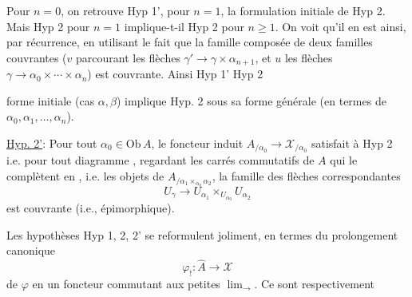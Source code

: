 Pour $n=0$, on retrouve Hyp 1', pour $n=1$, la formulation initiale de Hyp 2. Mais Hyp 2 pour $n=1$ implique-t-il Hyp 2 pour  $n\geq1$. On voit qu'il en est ainsi, par récurrence, en utilisant le fait que la famille composée de deux familles couvrantes
($v$ parcourant les flèches $\gamma'\longrightarrow\gamma\times\alpha_{n+1}$, et $u$ les flèches $\gamma\longrightarrow\alpha_0\times\cdots\times\alpha_n$) est couvrante. Ainsi Hyp 1'  \inserted{$+$} Hyp 2

forme initiale (cas $\alpha,\beta$) implique Hyp. 2 sous sa forme générale (en termes de $\alpha_0,\alpha_1,\ldots,\alpha_n$).

\uline{Hyp. 2'}: Pour tout $\alpha_0\in\mathrm{Ob}\,A$, le foncteur induit $A_{/\alpha_0}\longrightarrow\mathcal X_{/\alpha_0}$ satisfait à Hyp 2 i.e. pour tout diagramme
, regardant les carrés commutatifs de $A$ qui le complètent en
, i.e. les objets de $A_{/\alpha_1\times_{\alpha_0}\alpha_2}$, la famille des flèches correspondantes
\[U_\gamma\longrightarrow U_{\alpha_1}\times_{U_{\alpha_0}}U_{\alpha_2}\]
est couvrante (i.e., épimorphique).

Les hypothèses Hyp 1, 2, 2' se reformulent joliment, en termes du prolongement canonique
\[\varphi_!:\widehat A\longrightarrow\mathcal X\]
de $\varphi$ en un foncteur  commutant  aux petites $\lim_{\longrightarrow}$. Ce sont respectivement

